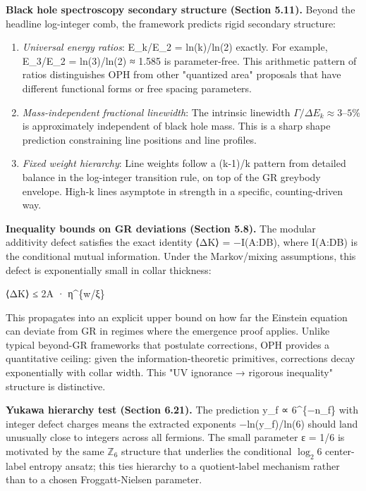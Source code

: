 \textbf{Black hole spectroscopy secondary structure (Section 5.11).} Beyond the headline log-integer comb, the framework predicts rigid secondary structure:

\begin{enumerate}
\def\labelenumi{\arabic{enumi}.}
\item
  \emph{Universal energy ratios}: E\_k/E\_2 = ln(k)/ln(2) exactly. For example, E\_3/E\_2 = ln(3)/ln(2) ≈ 1.585 is parameter-free. This arithmetic pattern of ratios distinguishes OPH from other "quantized area" proposals that have different functional forms or free spacing parameters.
\item
  \emph{Mass-independent fractional linewidth}: The intrinsic linewidth \(\Gamma/\Delta E_k \approx 3\text{--}5\%\) is approximately independent of black hole mass. This is a sharp shape prediction constraining line positions and line profiles.
\item
  \emph{Fixed weight hierarchy}: Line weights follow a (k-1)/k pattern from detailed balance in the log-integer transition rule, on top of the GR greybody envelope. High-k lines asymptote in strength in a specific, counting-driven way.
\end{enumerate}

\textbf{Inequality bounds on GR deviations (Section 5.8).} The modular additivity defect satisfies the exact identity ⟨ΔK⟩ = −I(A:D\textbar B), where I(A:D\textbar B) is the conditional mutual information. Under the Markov/mixing assumptions, this defect is exponentially small in collar thickness:

\textbar⟨ΔK⟩\textbar{} ≤ 2\textbar A\textbar{} · η\^{}\{w/ξ\}

This propagates into an explicit upper bound on how far the Einstein equation can deviate from GR in regimes where the emergence proof applies. Unlike typical beyond-GR frameworks that postulate corrections, OPH provides a quantitative ceiling: given the information-theoretic primitives, corrections decay exponentially with collar width. This "UV ignorance → rigorous inequality" structure is distinctive.

\textbf{Yukawa hierarchy test (Section 6.21).} The prediction y\_f ∝ 6\^{}\{−n\_f\} with integer defect charges means the extracted exponents −ln(y\_f)/ln(6) should land unusually close to integers across all fermions. The small parameter ε = 1/6 is motivated by the same \( \mathbb{Z}_6 \) structure that underlies the conditional \(\log_2 6\) center-label entropy ansatz; this ties hierarchy to a quotient-label mechanism rather than to a chosen Froggatt-Nielsen parameter.

